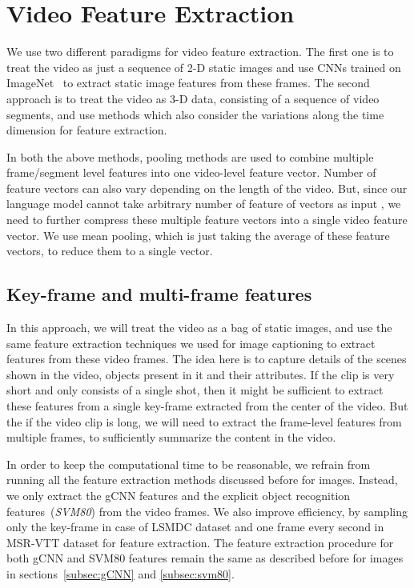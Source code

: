 \section{Video Feature Extraction}
\label{sec:VideoFeat}
We use two different paradigms for video feature extraction.
The first one is to treat the video as just a sequence of 2-D static images and
use CNNs trained on ImageNet~\cite{ImagenetOrig} to extract static image
features from these frames.
The second approach is to treat the video as 3-D data, consisting of a
sequence of video segments, and use methods which also consider the variations
along the time dimension for feature extraction.

In both the above methods, pooling methods are used to combine multiple
frame/segment level features into one video-level feature vector.
Number of feature vectors can also vary depending on the length of the video.
But, since our language model cannot take arbitrary number of feature of vectors
as input , we need to further compress these multiple feature vectors into a
single video feature vector. 
We use mean pooling, which is just taking the average of these feature vectors,
to reduce them to a single vector.

\subsection{Key-frame and multi-frame features}
In this approach, we will treat the video as a bag of static images, and use the
same feature extraction techniques we used for image captioning to extract
features from these video frames.
The idea here is to capture details of the scenes shown in the video, objects
present in it and their attributes.
If the clip is very short and only consists of a single shot, then it might be
sufficient to extract these features from a single key-frame extracted from the
center of the video. 
But the if the video clip is long, we will need to extract the frame-level
features from multiple frames, to sufficiently summarize the content in the
video.

In order to keep the computational time to be reasonable, we refrain from
running all the feature extraction methods discussed before for images.
Instead, we only extract the gCNN features and the explicit object recognition
features~(\emph{SVM80}) from the video frames.
We also improve efficiency, by sampling only the key-frame in case of LSMDC
dataset and one frame every second in MSR-VTT dataset for feature extraction.
The feature extraction procedure for both gCNN and SVM80 features remain the
same as described before for images in sections~\ref{subsec:gCNN} and
\ref{subsec:svm80}. 

